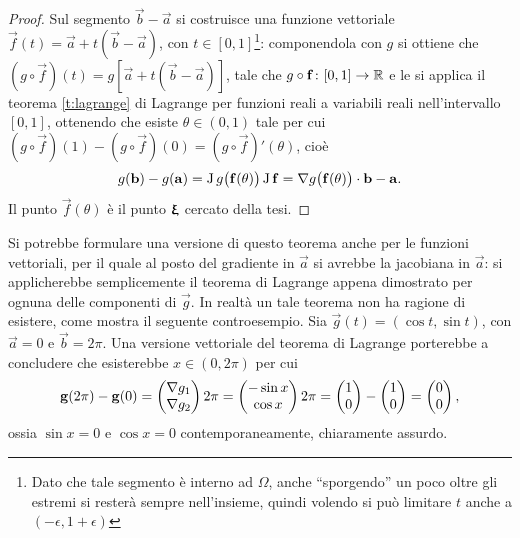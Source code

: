 \begin{proof}
Sul segmento $\vec b-\vec a$ si costruisce una funzione vettoriale $\vec f(t)=\vec a+t(\vec b-\vec a)$, con $t\in[0,1]$\footnote{Dato che tale segmento è interno ad $\Omega$, anche ``sporgendo'' un poco oltre gli estremi si resterà sempre nell'insieme, quindi volendo si può limitare $t$ anche a $(-\epsilon,1+\epsilon)$}: componendola con $g$ si ottiene che $(g\circ\vec f)(t)=g[\vec a+t(\vec b-\vec a)]$, tale che $g\circ\mathbf{f}\colon[0,1]\to\mathbb{R}$ e le si applica il teorema \ref{t:lagrange} di Lagrange per funzioni reali a variabili reali nell'intervallo $[0,1]$, ottenendo che esiste $\theta\in(0,1)$ tale per cui $(g\circ\vec f)(1)-(g\circ\vec f)(0)=(g\circ\vec f)'(\theta)$, cioè
\[
g(\mathbf{b})-g(\mathbf{a})=\operatorname{J} g\big(\mathbf{f}(\theta)\big)\operatorname{J}\mathbf{f}={\nabla g\big(\mathbf{f}(\theta)\big)}\cdot{\mathbf{b}-\mathbf{a}}.
\]
Il punto $\vec f(\theta)$ è il punto $\bm{\upxi}$ cercato della tesi.
\end{proof}
Si potrebbe formulare una versione di questo teorema anche per le funzioni vettoriali, per il quale al posto del gradiente in $\vec a$ si avrebbe la jacobiana in $\vec a$: si applicherebbe semplicemente il teorema di Lagrange appena dimostrato per ognuna delle componenti di $\vec g$. In realtà un tale teorema non ha ragione di esistere, come mostra il seguente controesempio. Sia $\vec g(t)=(\cos t,\sin t)$, con $\vec a=0$ e $\vec b=2\pi$. Una versione vettoriale del teorema di Lagrange porterebbe a concludere che esisterebbe $x\in(0,2\pi)$ per cui
\[
\mathbf{g}(2\pi)-\mathbf{g}(0)=\begin{pmatrix}\nabla g_1\\\nabla g_2\end{pmatrix} 2\pi=\begin{pmatrix}-\sin x\\\cos x\end{pmatrix} 2\pi= \begin{pmatrix}1\\0\end{pmatrix}-\begin{pmatrix}1\\0\end{pmatrix}= \begin{pmatrix}0\\0\end{pmatrix},
\]
ossia $\sin x=0$ e $\cos x=0$ contemporaneamente, chiaramente assurdo.

